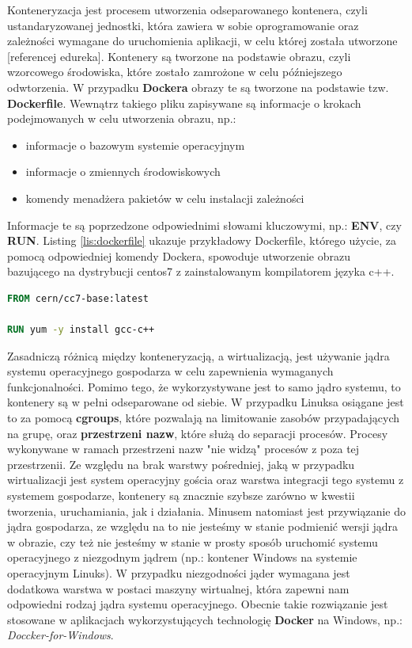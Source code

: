 Konteneryzacja jest procesem utworzenia odseparowanego kontenera, czyli ustandaryzowanej jednostki, która zawiera w sobie oprogramowanie oraz zależności wymagane do uruchomienia aplikacji, w celu której została utworzone [referencej edureka]. Kontenery są tworzone na podstawie obrazu, czyli wzorcowego środowiska, które zostało zamrożone w celu późniejszego odwtorzenia. W przypadku \textbf{Dockera} obrazy te są tworzone na podstawie tzw. \textbf{Dockerfile}. Wewnątrz takiego pliku zapisywane są informacje o krokach podejmowanych w celu utworzenia obrazu, np.:
\begin{itemize}
\item informacje o bazowym systemie operacyjnym
\item informacje o zmiennych środowiskowych
\item komendy menadżera pakietów w celu instalacji zależności
\end{itemize}
Informacje te są poprzedzone odpowiednimi słowami kluczowymi, np.: \textbf{ENV}, czy \textbf{RUN}. Listing \ref{lis:dockerfile} ukazuje przykładowy Dockerfile, którego użycie, za pomocą odpowiedniej komendy Dockera, spowoduje utworzenie obrazu bazującego na dystrybucji centos7 z zainstalowanym kompilatorem języka c++.

\begin{lstlisting}[label={lis:dockerfile}, language=Dockerfile, caption={Przykładowy Dockerfile}]
FROM cern/cc7-base:latest

RUN yum -y install gcc-c++
\end{lstlisting}

Zasadniczą różnicą między konteneryzacją, a wirtualizacją, jest używanie jądra systemu operacyjnego gospodarza w celu zapewnienia wymaganych funkcjonalności. Pomimo tego, że wykorzystywane jest to samo jądro systemu, to kontenery są w pełni odseparowane od siebie. W przypadku Linuksa osiągane jest to za pomocą \textbf{cgroups}, które pozwalają na limitowanie zasobów przypadających na grupę, oraz \textbf{przestrzeni nazw}, które służą do separacji procesów. Procesy wykonywane w ramach przestrzeni nazw "nie widzą" procesów z poza tej przestrzenii. Ze względu na brak warstwy pośredniej, jaką w przypadku wirtualizacji jest system operacyjny gościa oraz warstwa integracji tego systemu z systemem gospodarze, kontenery są znacznie szybsze zarówno w kwestii tworzenia, uruchamiania, jak i działania. Minusem natomiast jest przywiązanie do jądra gospodarza, ze względu na to nie jesteśmy w stanie podmienić wersji jądra w obrazie, czy też nie jesteśmy w stanie w prosty sposób uruchomić systemu operacyjnego z niezgodnym jądrem (np.: kontener Windows na systemie operacyjnym Linuks). W przypadku niezgodności jąder wymagana jest dodatkowa warstwa w postaci maszyny wirtualnej, która zapewni nam odpowiedni rodzaj jądra systemu operacyjnego. Obecnie takie rozwiązanie jest stosowane w aplikacjach wykorzystujących technologię \textbf{Docker} na Windows, np.: \textit{Doccker-for-Windows}.

